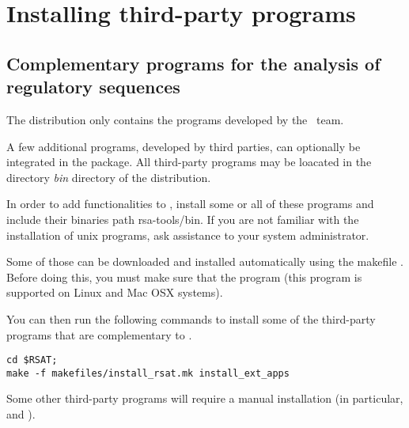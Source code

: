 \documentclass[12pt,a4paper, oneside]{scrreprt} %
\begin{document}



\chapter{Installing third-party programs}

\section{Complementary programs for the analysis of regulatory
  sequences}

The \RSAT distribution only contains the programs developed by the
\RSAT \ team. 

A few additional programs, developed by third parties, can optionally
be integrated in the package. All third-party programs may be loacated
in the directory \emph{bin} directory of the \RSAT distribution.  

In order to add functionalities to \RSAT, install some or all of these
programs and include their binaries path rsa-tools/bin. If you are not
familiar with the installation of unix programs, ask assistance to
your system administrator.

Some of those can be downloaded and installed automatically using the
makefile . Before doing this, you must make
sure that the program  (this program is supported on
Linux  and Mac OSX
systems).

You can then run the following commands to install some of the
third-party programs that are complementary to \RSAT.

\begin{lstlisting}
cd $RSAT;
make -f makefiles/install_rsat.mk install_ext_apps
\end{lstlisting}

Some other third-party programs will require a manual installation (in
particular,  and ).
\end{document}
